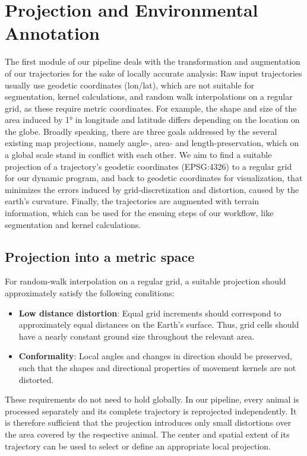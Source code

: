\chapter{Projection and Environmental Annotation}
\label{ch:data-environment}

The first module of our pipeline deals with the transformation and augmentation of our trajectories for the sake of locally accurate analysis:
Raw input trajectories usually use geodetic coordinates (lon/lat), which are not suitable for segmentation, kernel calculations, and random walk interpolations on a regular grid,
as these require metric coordinates.
For example, the shape and size of the area induced by 1° in longitude and latitude differs depending on the location on the globe.
Broadly speaking, there are three goals addressed by the several existing map projections, namely angle-, area- and length-preservation, which on a global scale stand in conflict with each other.
We aim to find a suitable projection of a trajectory's geodetic coordinates (EPSG:4326) to a regular grid for our dynamic program, and back to geodetic coordinates for visualization, that minimizes the 
errors induced by grid-discretization and distortion, caused by the earth's curvature.
Finally, the trajectories are augmented with terrain information, which can be used for the ensuing steps of our workflow, like segmentation and kernel calculations.

\section{Projection into a metric space}
For random-walk interpolation on a regular grid, a suitable projection should approximately satisfy the following conditions:
\begin{itemize}
  \item \textbf{Low distance distortion}: Equal grid increments should correspond to approximately equal distances on the Earth's surface. 
  Thus, grid cells should have a nearly constant ground size throughout the relevant area.
  \item \textbf{Conformality}: Local angles and changes in direction should be preserved, such that the shapes and directional properties of movement kernels are not distorted.
\end{itemize}

These requirements do not need to hold globally. In our pipeline, every animal is processed separately and its complete trajectory is reprojected independently. 
It is therefore sufficient that the projection introduces only small distortions over the area covered by the respective animal. 
The center and spatial extent of its trajectory can be used to select or define an appropriate local projection.

